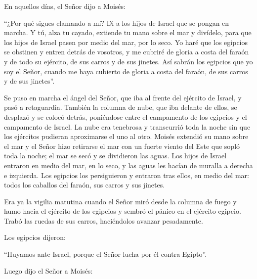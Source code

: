 			\begin{readbody}En aquellos días, el Señor dijo a Moisés: \end{readbody}
			
			\begin{readtalk}“¿Por qué sigues clamando a mí? Di a los hijos de Israel que se pongan en marcha. Y tú, alza tu cayado, extiende tu mano sobre el mar y divídelo, para que los hijos de Israel pasen por medio del mar, por lo seco. Yo haré que los egipcios se obstinen y entren detrás de vosotros, y me cubriré de gloria a costa del faraón y de todo su ejército, de sus carros y de sus jinetes. Así sabrán los egipcios que yo soy el Señor, cuando me haya cubierto de gloria a costa del faraón, de sus carros y de sus jinetes”. \end{readtalk}
			
			\begin{readbody}Se puso en marcha el ángel del Señor, que iba al frente del ejército de Israel, y pasó a retaguardia. También la columna de nube, que iba delante de ellos, se desplazó y se colocó detrás, poniéndose entre el campamento de los egipcios y el campamento de Israel. La nube era tenebrosa y transcurrió toda la noche sin que los ejércitos pudieran aproximarse el uno al otro. Moisés extendió su mano sobre el mar y el Señor hizo retirarse el mar con un fuerte viento del Este que sopló toda la noche; el mar se secó y se dividieron las aguas. Los hijos de Israel entraron en medio del mar, en lo seco, y las aguas les hacían de muralla a derecha e izquierda. Los egipcios los persiguieron y entraron tras ellos, en medio del mar: todos los caballos del faraón, sus carros y sus jinetes. \end{readbody}
			
			\begin{readbody}Era ya la vigilia matutina cuando el Señor miró desde la columna de fuego y humo hacia el ejército de los egipcios y sembró el pánico en el ejército egipcio. Trabó las ruedas de sus carros, haciéndolos avanzar pesadamente. \end{readbody}
			
			\begin{readbody}Los egipcios dijeron: \end{readbody}
			
			\begin{readtalk}“Huyamos ante Israel, porque el Señor lucha por él contra Egipto”. \end{readtalk}
			
			\begin{readbody}Luego dijo el Señor a Moisés: \end{readbody}
			
